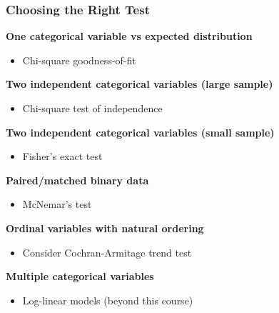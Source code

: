 \documentclass{beamer}
\begin{document}
\begin{frame}
\frametitle{Choosing the Right Test}

\textbf{One categorical variable vs expected distribution}
\begin{itemize}
\item Chi-square goodness-of-fit
\end{itemize}

\textbf{Two independent categorical variables (large sample)}
\begin{itemize}
\item Chi-square test of independence
\end{itemize}

\textbf{Two independent categorical variables (small sample)}
\begin{itemize}
\item Fisher's exact test
\end{itemize}

\textbf{Paired/matched binary data}
\begin{itemize}
\item McNemar's test
\end{itemize}

\textbf{Ordinal variables with natural ordering}
\begin{itemize}
\item Consider Cochran-Armitage trend test
\end{itemize}

\textbf{Multiple categorical variables}
\begin{itemize}
\item Log-linear models (beyond this course)
\end{itemize}
\end{frame}
\end{document}
